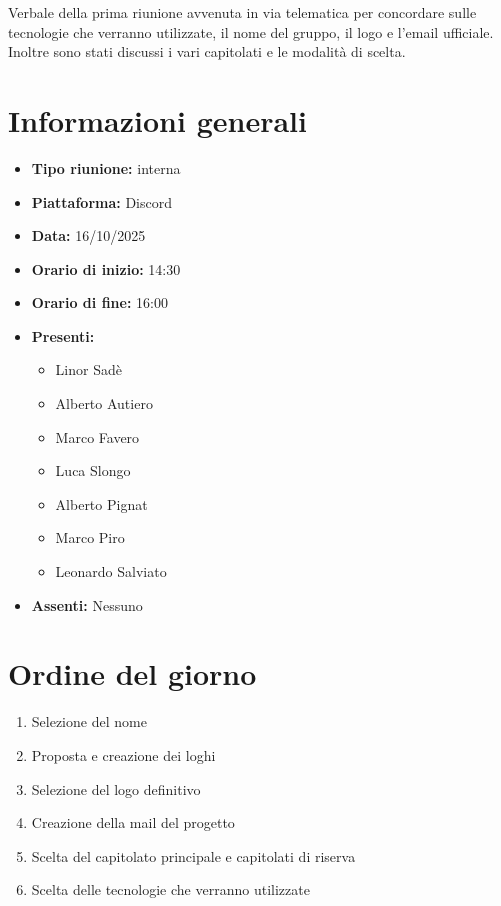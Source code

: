 \documentclass[a4paper,12pt]{article}
\begin{document}
\begin{center}
\begin{tcolorbox}[colback=secondaryblue!10,colframe=secondaryblue,width=0.9\textwidth,arc=3mm,boxrule=0.8pt,title={\bfseries Abstract}]
Verbale della prima riunione avvenuta in via telematica per concordare sulle tecnologie che verranno utilizzate, il nome del gruppo, il logo e l'email ufficiale. Inoltre sono stati discussi i vari capitolati e le modalità di scelta.
\end{tcolorbox}
\end{center}

\newpage

\section{Informazioni generali}

\begin{itemize}
    \item \textbf{Tipo riunione:} interna
    \item \textbf{Piattaforma:} Discord
    \item \textbf{Data:} 16/10/2025
    \item \textbf{Orario di inizio:} 14:30
    \item \textbf{Orario di fine:} 16:00
    \item \textbf{Presenti:}
    \begin{itemize}[leftmargin=1.5em, itemsep=3pt, label={\rule[0.5ex]{0.4em}{0.4em}}]
        \item Linor Sadè
        \item Alberto Autiero
        \item Marco Favero
        \item Luca Slongo
        \item Alberto Pignat
        \item Marco Piro
        \item Leonardo Salviato
    \end{itemize}
    \item \textbf{Assenti:} Nessuno
\end{itemize}

\section{Ordine del giorno}

\begin{enumerate}
    \item Selezione del nome
    \item Proposta e creazione dei loghi
    \item Selezione del logo definitivo
    \item Creazione della mail del progetto
    \item Scelta del capitolato principale e capitolati di riserva
    \item Scelta delle tecnologie che verranno utilizzate
\end{enumerate}
\end{document}
